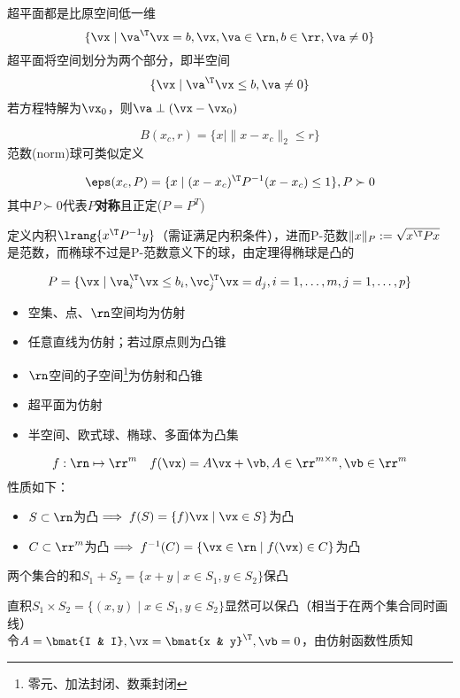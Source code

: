 \begin{definition}
超平面都是比原空间低一维
\[\{\vx\mid \va^\T\vx=b,\vx,\va\in\rn,b\in\rr,\va\ne 0\}\]
超平面将空间划分为两个部分，即半空间
\[\{\vx\mid \va^\T\vx\leq b,\va\ne 0\}\]
若方程特解为$\vx_0$，则$\va\perp(\vx-\vx_0)$
\end{definition}
\begin{definition}
\[B(x_c,r)=\{x\mid\|x-x_c\|_2\leq r\}\]
范数(norm)球可类似定义
\end{definition}
\begin{definition}[椭球(ellipsoid)]
\[\eps(x_c,P)=\{x\mid(x-x_c)^\T P^{-1}(x-x_c)\leq 1\},P\succ 0\]
其中$P\succ 0$代表$P$\textbf{对称}且正定($P=P^T$)
\end{definition}
\begin{analysis}
定义内积$\lrang{x^\T P^{-1}y}$（需证满足内积条件），进而P-范数$\|x\|_P:=\sqrt{x^\T Px}$是范数，而椭球不过是P-范数意义下的球，由定理得椭球是凸的
\end{analysis}
\begin{definition}
\[P=\{\vx\mid\va_i^\T\vx\leq b_i,\vc_j^\T\vx=d_j,i=1,\ldots,m,j=1,\ldots,p\}\]
\end{definition}
\begin{example}
\begin{itemize}
	\item 空集、点、$\rn$空间均为仿射
	\item 任意直线为仿射；若过原点则为凸锥
	\item $\rn$空间的子空间\footnote{零元、加法封闭、数乘封闭}为仿射和凸锥
	\item 超平面为仿射
	\item 半空间、欧式球、椭球、多面体为凸集
\end{itemize}
\end{example}

\begin{definition}[仿射函数]
\[f:\rn\mapsto\rr^m\quad f(\vx)=A\vx+\vb,A\in\rr^{m\times n},\vb\in\rr^m\]
性质如下：
\begin{itemize}
	\item $S\subset\rn$为凸$\implies f(S)=\{f)\vx\mid\vx\in S\}$为凸
	\item $C\subset\rr^m$为凸$\implies f^{-1}(C)=\{\vx\in\rn\mid f(\vx)\in C\}$为凸
\end{itemize}
\end{definition}
\begin{example}
两个集合的和$S_1+S_2=\{x+y\mid x\in S_1,y\in S_2\}$保凸
\end{example}
\begin{analysis}
直积$S_1\times S_2=\{(x,y)\mid x\in S_1,y\in S_2\}$显然可以保凸（相当于在两个集合同时画线）\\
令$A=\bmat{I & I},\vx=\bmat{x & y}^\T,\vb=0$，由仿射函数性质知
\end{analysis}

